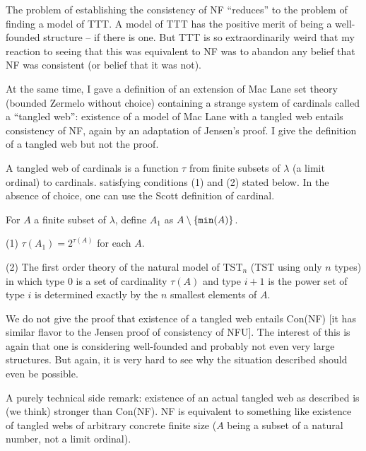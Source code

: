 \documentclass{slides}
\begin{document}
\begin{slide}

The problem of establishing the consistency of NF ``reduces'' to the problem of finding a model of TTT.  A model of TTT has the positive merit of being a well-founded structure -- if there is one.   But TTT is so extraordinarily weird that my reaction to seeing that this was equivalent to NF was to abandon any belief that NF was consistent (or belief that it was not).

At the same time, I gave a definition of an extension of Mac Lane set theory (bounded Zermelo without choice) containing a strange system of cardinals called a ``tangled web'':  existence of a model of Mac Lane with a tangled web entails consistency of NF, again by an adaptation of Jensen's proof.  I give the definition of a tangled web but not the proof.

\end{slide}

\begin{slide}

A tangled web of cardinals is a function $\tau$ from finite subsets of $\lambda$ (a limit ordinal) to cardinals.  satisfying conditions (1) and (2) stated below.  In the absence of choice, one can use the Scott definition of cardinal.

For $A$ a finite subset of $\lambda$, define $A_1$ as $A \setminus \{{\tt min}(A)\}$.

(1) $\tau(A_1) = 2^{\tau(A)}$ for each $A$.

(2) The first order theory of the natural model of TST$_n$ (TST using only $n$ types) in which type 0 is a set of cardinality $\tau(A)$ and type $i+1$ is the power set of type $i$ is determined
exactly by the $n$ smallest elements of $A$.

\end{slide}

\begin{slide}

We do not give the proof that existence of a tangled web entails Con(NF) [it has similar flavor to the Jensen proof of consistency of NFU].  The interest of this is again that one is considering well-founded and probably not even very large structures.  But again, it is very hard to see why the situation described should even be possible.

A purely technical side remark:  existence of an actual tangled web as described is (we think) stronger than Con(NF).  NF is equivalent to something like existence of tangled webs of arbitrary concrete finite size ($A$ being a subset of a natural number, not a limit ordinal).

\end{slide}
\end{document}
